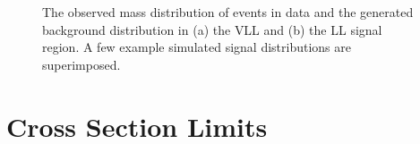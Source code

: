 \begin{figure}
\caption{The observed mass distribution of events in data and the generated background distribution in (a) the \acs*{VLL} and (b) the \acs*{LL} signal region. A few example simulated signal distributions are superimposed.}
\label{fig:signal_mass}
\end{figure}


\section{Cross Section Limits}

